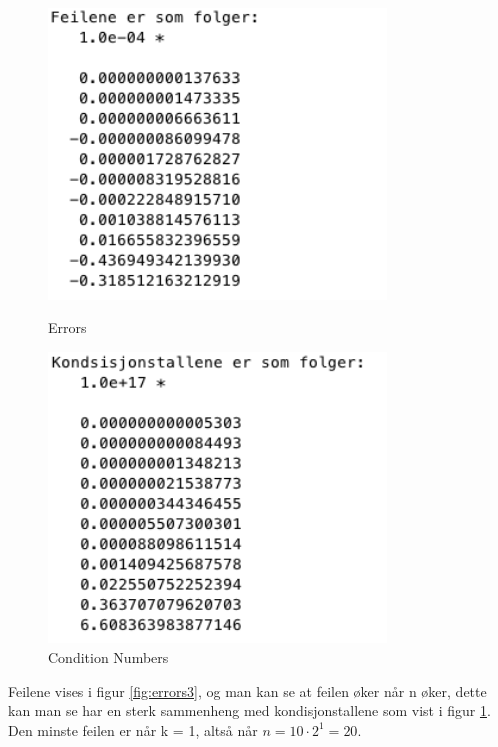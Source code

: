 \begin{figure}[h]
\centering
\begin{minipage}{.5\textwidth}
  \centering
  \includegraphics[width=0.8\textwidth]{sections/Exercise3/result3}
    \caption{Errors}
    \label{fig:errors3}
\end{minipage}%
\begin{minipage}{.5\textwidth}
  \centering
  \includegraphics[width=0.8\textwidth]{sections/Exercise3/cond3}
    \caption{Condition Numbers}
    \label{fig:cond3}
\end{minipage}
\end{figure}
 
Feilene vises i figur \ref{fig:errors3}, og man kan se at feilen øker når n øker, dette kan man se har en sterk sammenheng med kondisjonstallene som vist i figur \ref{fig:cond3}. Den minste feilen er når k = 1, altså når $n = 10\cdot2^1 = 20$.


% 